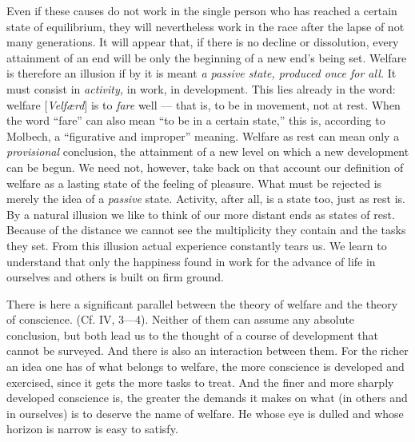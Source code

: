 \documentclass[12pt,a4paper,openany]{book}
\newcommand{\opage}[1]{\marginnote{\footnotesize\textit{[#1]}}}
\begin{document}
Even if these causes do not work in the single person who has reached a certain state of equilibrium, they
will nevertheless work in the race after the lapse of not many generations. It will appear that, if
there is no decline or dissolution, every attainment of an end will be only the beginning of a new end's
being set. Welfare is therefore an illusion if by it is meant \textit{a passive state, produced once for
all.} It must consist in \textit{activity,} in work, in development. This lies already in the word: welfare
[\textit{Velfærd}] is to \textit{fare} well --- that is, to be in movement, not at rest. When the word
``fare'' can also mean ``to be in a certain state,'' this is, according to Molbech, a ``figurative and
improper'' meaning. Welfare as rest can mean only a \textit{provisional} conclusion, the attainment of a new
level on which a new development can be begun. We need not, however, take back on that account our
definition of welfare as a lasting state of the feeling of pleasure. What must be rejected is merely the
idea of a \textit{passive} state. Activity, after all, is a state too, just as rest is. By a natural
illusion we like to think of our more distant ends as states of rest. Because of the distance we cannot see
the multiplicity they contain and the tasks they set. From this illusion actual experience constantly tears
us. We learn to understand that only the happiness found in work for the advance of life in ourselves and
others is built on firm ground.

There is here a significant parallel between the theory of welfare
\opage{144}and the theory of conscience. (Cf. IV, 3---4). Neither of them can assume any absolute conclusion, but
both lead us to the thought of a course of development that cannot be surveyed. And there is also an
interaction between them. For the richer an idea one has of what belongs to welfare, the more conscience is
developed and exercised, since it gets the more tasks to treat. And the finer and more sharply developed
conscience is, the greater the demands it makes on what (in others and in ourselves) is to deserve the name
of welfare. He whose eye is dulled and whose horizon is narrow is easy to satisfy.
\end{document}
